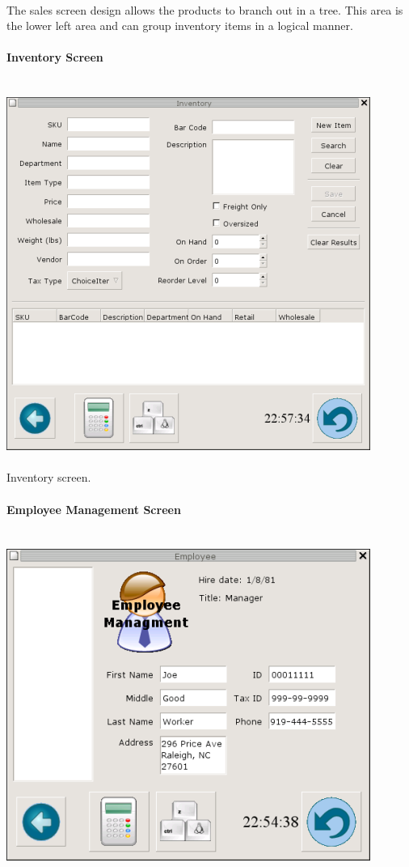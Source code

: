 \documentclass{report}
\begin{document}
\\
The sales screen design allows the products to branch out in a tree.  This area is the lower left area and can group
inventory items in a logical manner.\\
\\
{\bf Inventory Screen}\\
\\
\\
\includegraphics{ys_inv_screener.png}\\
\\
Inventory screen.\\
\\
{\bf Employee Management Screen}\\
\\
\\
\includegraphics{ys_employee_screener.png}\\
\end{document}
